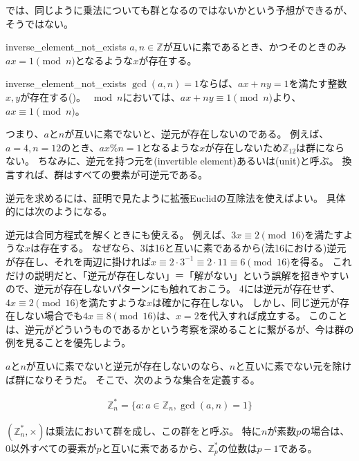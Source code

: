 では、同じように乗法についても群となるのではないかという予想ができるが、そうではない。

\begin{Prop}{}{inverse_element_not_exists}
$a,n\in\mathbb{Z}$が互いに素であるとき、かつそのときのみ$ax=1\pmod{n}$となるような$x$が存在する。
\end{Prop}

\begin{prProof}{inverse_element_not_exists}
$\gcd(a,n)=1$ならば、$ax+ny=1$を満たす整数$x,y$が存在する()。
$\bmod{n}$においては、$ax+ny\equiv1\pmod{n}$より、$ax\equiv1\pmod{n}$。
\end{prProof}

つまり、$a$と$n$が互いに素でないと、逆元が存在しないのである。
例えば、$a=4,n=12$のとき、$ax \% n =1$となるような$x$が存在しないため$\mathbb{Z}_{12}$は群にならない。
ちなみに、逆元を持つ元を(invertible element)あるいは(unit)と呼ぶ。
換言すれば、群はすべての要素が可逆元である。

逆元を求めるには、証明で見たように拡張Euclidの互除法を使えばよい。
具体的には次のようになる。


逆元は合同方程式を解くときにも使える。
例えば、$3x\equiv2\pmod{16}$を満たすような$x$は存在する。
なぜなら、3は16と互いに素であるから(法16における)逆元が存在し、それを両辺に掛ければ$x \equiv 2\cdot3^{-1} \equiv 2\cdot11 \equiv 6\pmod{16}$を得る。
これだけの説明だと、「逆元が存在しない」＝「解がない」という誤解を招きやすいので、逆元が存在しないパターンにも触れておこう。
4には逆元が存在せず、$4x\equiv2\pmod{16}$を満たすような$x$は確かに存在しない。
しかし、同じ逆元が存在しない場合でも$4x\equiv8\pmod{16}$は、$x=2$を代入すれば成立する。
このことは、逆元がどういうものであるかという考察を深めることに繋がるが、今は群の例を見ることを優先しよう。

$a$と$n$が互いに素でないと逆元が存在しないのなら、$n$と互いに素でない元を除けば群になりそうだ。
そこで、次のような集合を定義する。

\begin{align*}
\mathbb{Z}_n^* = \{a : a \in \mathbb{Z}_n, \gcd(a,n) = 1\}
\end{align*}

$(\mathbb{Z}_n^*,\times)$は乗法において群を成し、この群をと呼ぶ。
特に$n$が素数$p$の場合は、$0$以外すべての要素が$p$と互いに素であるから、$\mathbb{Z}_p^*$の位数は$p-1$である。

